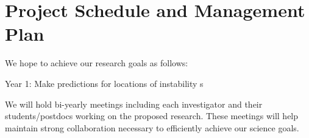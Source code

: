\section{Project Schedule and Management Plan}

We hope to achieve our research goals as follows:

Year 1: Make predictions for locations of instability s 

We will  hold bi-yearly meetings including each investigator and their students/postdocs working on the proposed research. These meetings will help maintain strong collaboration necessary to efficiently achieve our science goals.
